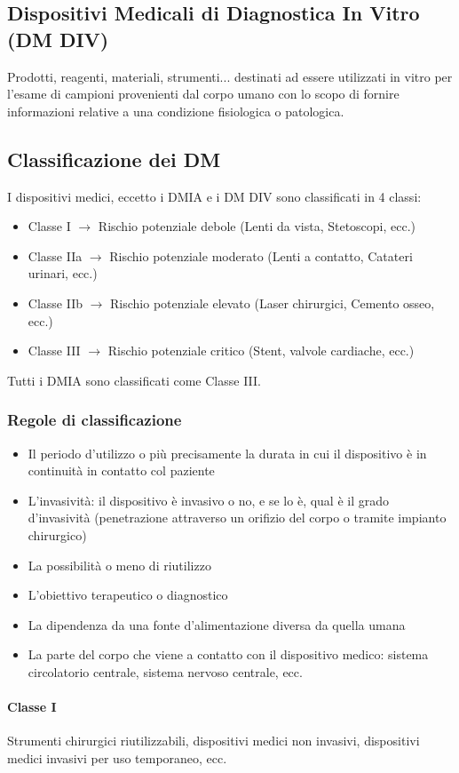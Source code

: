 \documentclass[a4paper]{article}
\begin{document}
\subsection{Dispositivi Medicali di Diagnostica In Vitro (DM DIV)}
Prodotti, reagenti, materiali, strumenti... destinati ad essere utilizzati in 
vitro per l'esame di campioni provenienti dal corpo umano con lo scopo di 
fornire informazioni relative a una condizione fisiologica o patologica.
\subsection{Classificazione dei DM}
I dispositivi medici, eccetto i DMIA e i DM DIV sono classificati in 4 classi:
\begin{itemize}
    \item Classe I $\to$ Rischio potenziale debole (Lenti da vista, 
    Stetoscopi, ecc.)
    \item Classe IIa $\to$ Rischio potenziale moderato (Lenti a contatto, 
    Catateri urinari, ecc.)
    \item Classe IIb $\to$ Rischio potenziale elevato (Laser chirurgici, 
    Cemento osseo, ecc.)
    \item Classe III $\to$ Rischio potenziale critico (Stent, valvole cardiache, 
    ecc.)
\end{itemize}
Tutti i DMIA sono classificati come Classe III.
\subsubsection{Regole di classificazione}
\begin{itemize}
\item Il periodo d’utilizzo o più precisamente la durata in cui il dispositivo
è in continuità in contatto col paziente
\item L’invasività: il dispositivo è invasivo o no, e se lo è, qual è il grado
d’invasività (penetrazione attraverso un orifizio del corpo o tramite 
impianto chirurgico)
\item La possibilità o meno di riutilizzo
\item L’obiettivo terapeutico o diagnostico
\item La dipendenza da una fonte d’alimentazione diversa da quella umana
\item La parte del corpo che viene a contatto con il dispositivo medico: sistema circolatorio centrale,
sistema nervoso centrale, ecc.
\end{itemize}
\paragraph{Classe I}
Strumenti chirurgici riutilizzabili, dispositivi medici non invasivi, 
dispositivi medici invasivi per uso temporaneo, ecc.
\end{document}
